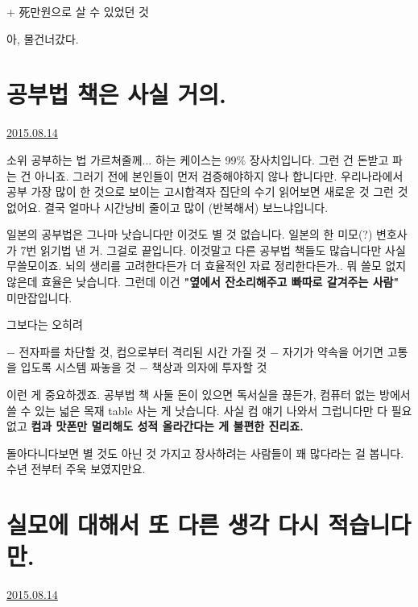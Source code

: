 + 死만원으로 살 수 있었던 것
\vspace{5mm}

아, 물건너갔다.
\vspace{5mm}




\section{공부법 책은 사실 거의.}
\href{https://www.kockoc.com/Apoc/251344}{2015.08.14}

\vspace{5mm}

소위 공부하는 법 가르쳐줄께... 하는 케이스는 99$\%$ 장사치입니다. 그런 건 돈받고 파는 건 아니죠.
그러기 전에 본인들이 먼저 검증해야하지 않나 합니다만.
우리나라에서 공부 가장 많이 한 것으로 보이는 고시합격자 집단의 수기 읽어보면 새로운 것 그런 것 없어요.
결국 얼마나 시간낭비 줄이고 많이 (반복해서) 보느냐입니다.
\vspace{5mm}

일본의 공부법은 그나마 낫습니다만 이것도 별 것 없습니다.
일본의 한 미모(?) 변호사가 7번 읽기법 낸 거. 그걸로 끝입니다. 이것말고 다른 공부법 책들도 많습니다만 사실 무쓸모이죠.
뇌의 생리를 고려한다든가 더 효율적인 자료 정리한다든가.. 뭐 쓸모 없지 않은데 효율은 낮습니다.
그런데 이건 \textbf{"옆에서 잔소리해주고 빠따로 갈겨주는 사람"} 미만잡입니다.
\vspace{5mm}

그보다는 오히려
\vspace{5mm}

$-$ 전자파를 차단할 것, 컴으로부터 격리된 시간 가질 것
$-$ 자기가 약속을 어기면 고통을 입도록 시스템 짜놓을 것
$-$ 책상과 의자에 투자할 것
\vspace{5mm}

이런 게 중요하겠죠. 공부법 책 사둘 돈이 있으면 독서실을 끊든가, 컴퓨터 없는 방에서 쓸 수 있는 넓은 목재 table 사는 게 낫습니다.
사실 컴 얘기 나와서 그럽니다만 다 필요없고 \textbf{컴과 맛폰만 멀리해도 성적 올라간다는 게 불편한 진리죠.}
\vspace{5mm}

돌아다니다보면 별 것도 아닌 것 가지고 장사하려는 사람들이 꽤 많다라는 걸 봅니다. 수년 전부터 주욱 보였지만요.
\vspace{5mm}






\section{실모에 대해서 또 다른 생각 다시 적습니다만.}
\href{https://www.kockoc.com/Apoc/251556}{2015.08.14}

